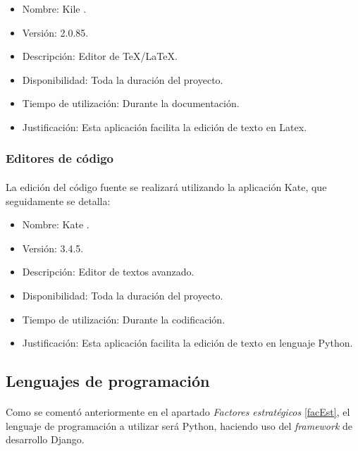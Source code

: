       \begin{itemize}
         \item Nombre: Kile \cite{kile}.
         \item Versión: 2.0.85.
         \item Descripción: Editor de TeX/LaTeX.
         \item Disponibilidad: Toda la duración del proyecto.
         \item Tiempo de utilización: Durante la documentación.
         \item Justificación: Esta aplicación facilita la edición de texto en
         Latex.
      \end{itemize}

      \subsubsection{Editores de código}

      \paragraph{}La edición del código fuente se realizará utilizando la
      aplicación Kate, que seguidamente se detalla:

      \begin{itemize}
         \item Nombre: Kate \cite{kate}.
         \item Versión: 3.4.5.
         \item Descripción: Editor de textos avanzado.
         \item Disponibilidad: Toda la duración del proyecto.
         \item Tiempo de utilización: Durante la codificación.
         \item Justificación: Esta aplicación facilita la edición de texto
               en lenguaje Python.
      \end{itemize}

   \subsection{Lenguajes de programación}

   \paragraph{}Como se comentó anteriormente en el apartado \textit{Factores
   estratégicos} \ref{facEst}, el lenguaje de programación a utilizar será
   Python, haciendo uso del \textit{framework} de desarrollo Django.

